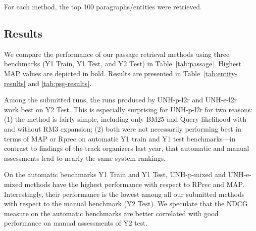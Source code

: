 \documentclass{article}
\begin{document}
For each method, the top 100 paragraphs/entities were retrieved.

\subsection{Results}

We compare the performance of our passage retrieval methods using three benchmarks (Y1 Train, Y1 Test, and Y2 Test) in Table~\ref{tab:passage}.
Highest MAP values are depicted in bold. Results are presented in Table~\ref{tab:entity-results} and \ref{tab:psg-results}.

Among the submitted runs, the runs produced by UNH-p-l2r and UNH-e-l2r work best on Y2 Test. This is especially surprising for UNH-p-l2r for two reasons: (1) the method is fairly simple, including only BM25 and Query likelihood with and without RM3 expansion; (2) both were not necessarily performing best in terms of MAP or Rprec on automatic Y1 train and Y1 test benchmarks---in contrast to findings of the track organizers last year, that automatic and manual assessments lead to nearly the same system rankings.

On the automatic benchmarks Y1 Train and Y1 Test, UNH-p-mixed and UNH-e-mixed methods have the highest performance with respect to RPrec and MAP. Interestingly, their performance is the lowest among all our submitted methods with respect to the manual benchmark (Y2 Test). We speculate that the NDCG measure on the automatic benchmarks are better correlated with good performance on manual assessments of Y2 test.
\end{document}
